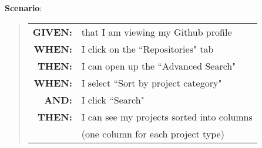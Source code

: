\documentclass[12pt]{article}
\newcommand{\GivenSc} {
	\noindent \textbf{GIVEN:}
	}
\newcommand{\WhenSc} {
	\noindent \textbf{WHEN:}
	}
\newcommand{\AndSc} {
	\noindent \textbf{AND:}
	}
\newcommand{\ThenSc} {
	\noindent \textbf{THEN:}
	}
\begin{document}
\begin{framed}
\noindent \textbf{Scenario}:
\begin{quote}
\begin{tabular}{rl}
\GivenSc & that I am viewing my \textsf{Github} profile\\
\WhenSc  & I click on the ``Repositories" tab\\
\ThenSc  & I can open up the ``Advanced Search"\\
\WhenSc  & I select ``Sort by project category"\\
\AndSc   & I click ``Search"\\
\ThenSc  & I can see my projects sorted into columns\\ 
         & (one column for each project type)
\end{tabular}
\end{quote}
\end{framed}

\pagebreak

\end{document}
